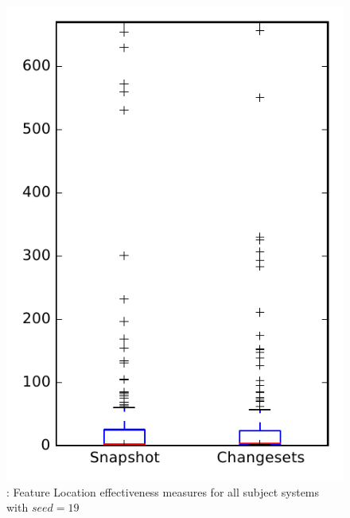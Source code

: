 
\begin{figure}
\centering
\includegraphics[height=0.4\textheight]{figures/flt_seed/rq1_overview_19}
\caption{\rone: Feature Location effectiveness measures for all subject systems with $seed=19$}
\label{fig:flt_seed:rq1:overview}
\end{figure}
